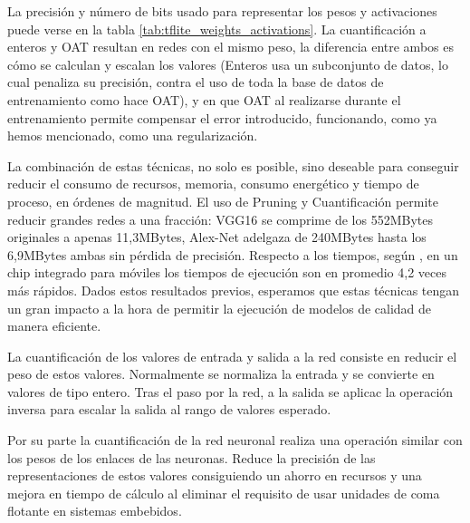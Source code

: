 La precisión y número de bits usado para representar los pesos y activaciones puede verse en la tabla \ref{tab:tflite_weights_activations}. La cuantificación a enteros y OAT resultan en redes con el mismo peso, la diferencia entre ambos es cómo se calculan y escalan los valores (Enteros usa un subconjunto de datos, lo cual penaliza su precisión, contra el uso de toda la base de datos de entrenamiento como hace OAT), y en que OAT al realizarse durante el entrenamiento permite compensar el error introducido, funcionando, como ya hemos mencionado, como una regularización.


  La combinación de estas técnicas, no solo es posible, sino deseable para conseguir reducir el consumo de recursos, memoria, consumo energético y tiempo de proceso, en órdenes de magnitud. El uso de Pruning y Cuantificación permite reducir grandes redes a una fracción: VGG16 se comprime de los 552MBytes originales a apenas 11,3MBytes, Alex-Net adelgaza de 240MBytes hasta los 6,9MBytes ambas sin pérdida de precisión\cite{Han2015}. Respecto a los tiempos, según \citeauthor{Han2015}, en un chip integrado para móviles los tiempos de ejecución son en promedio 4,2 veces más rápidos. Dados estos resultados previos, esperamos que estas técnicas tengan un gran impacto a la hora de permitir la ejecución de modelos de calidad de manera eficiente.














La cuantificación de los valores de entrada y salida a la red consiste en reducir el peso de estos valores. Normalmente se normaliza la entrada y se convierte en valores de tipo entero. Tras el paso por la red, a la salida se aplicac la operación inversa para escalar la salida al rango de valores esperado.

Por su parte la cuantificación de la red neuronal realiza una operación similar con los pesos de los enlaces de las neuronas. Reduce la precisión de las representaciones de estos valores consiguiendo un ahorro en recursos y una mejora en tiempo de cálculo al eliminar el requisito de usar unidades de coma flotante en sistemas embebidos.




% 

